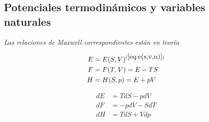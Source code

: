 \subsection{Potenciales termodinámicos y variables naturales}
\textit{Las relaciones de Maxwell correspondientes están en teoría}\txtsi{ }{(\ref{relaciones-maxwell})}


\begin{minipage}{0.5\textwidth}
    \begin{equation}
        \begin{split}
            E &= E(S,V)^{(\ref{eq:e(s,v,n)})}\\
            F &= F(T,V) = E - TS\\
            H &= H(S,p) = E + pV\\
        \end{split}
        \nonumber
    \end{equation}
\end{minipage}%
\begin{minipage}{0.5\textwidth}
    \begin{equation}
        \begin{split}
            dE &= TdS - pdV\\
            dF &= -pdV - SdT\\
            dH &= TdS + Vdp\\
        \end{split}
        \nonumber
    \end{equation}
    \end{minipage}%
    
    \nonumber


\newpage